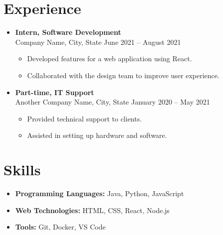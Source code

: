 \documentclass[a4paper,11pt]{article}
\begin{document}
  \section*{Experience}
  \begin{itemize}[leftmargin=0.5cm]
      \item \textbf{Intern, Software Development} \\
      Company Name, City, State \hfill June 2021 -- August 2021
      \begin{itemize}
          \item Developed features for a web application using React.
          \item Collaborated with the design team to improve user experience.
      \end{itemize}
  
      \item \textbf{Part-time, IT Support} \\
      Another Company Name, City, State \hfill January 2020 -- May 2021
      \begin{itemize}
          \item Provided technical support to clients.
          \item Assisted in setting up hardware and software.
      \end{itemize}
  \end{itemize}
  
  \section*{Skills}
  \begin{itemize}[leftmargin=0.5cm]
      \item \textbf{Programming Languages:} Java, Python, JavaScript
      \item \textbf{Web Technologies:} HTML, CSS, React, Node.js
      \item \textbf{Tools:} Git, Docker, VS Code
  \end{itemize}
  
  
\end{document}
